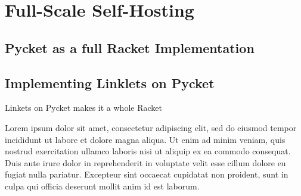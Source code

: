 \chapter{Full-Scale Self-Hosting}

\section{Pycket as a full Racket Implementation}
\section{Implementing Linklets on Pycket}



Linkets on Pycket makes it a whole Racket




	
Lorem ipsum dolor sit amet, consectetur adipiscing elit, sed do eiusmod tempor incididunt ut labore et dolore magna aliqua. Ut enim ad minim veniam, quis nostrud exercitation ullamco laboris nisi ut aliquip ex ea commodo consequat. Duis aute irure dolor in reprehenderit in voluptate velit esse cillum dolore eu fugiat nulla pariatur. Excepteur sint occaecat cupidatat non proident, sunt in culpa qui officia deserunt mollit anim id est laborum.
